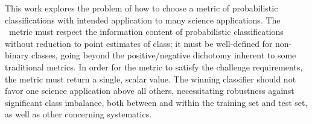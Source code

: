 This work explores the problem of how to choose a metric of probabilistic classifications with intended application to many science applications.
The \plasticc\ metric must respect the information content of probabilistic classifications without reduction to point estimates of class;
it must be well-defined for non-binary classes, going beyond the positive/negative dichotomy inherent to some traditional metrics.
In order for the metric to satisfy the challenge requirements, the metric must return a single, scalar value.
The winning classifier should not favor one science application above all others, necessitating robustness against significant class imbalance, both between and within the training set and test set, as well as other concerning systematics.

